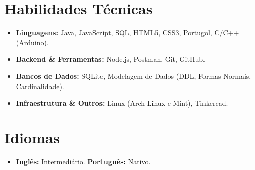\documentclass[11pt,a4paper]{article}
\begin{document}
\section*{Habilidades Técnicas}
\begin{itemize}[leftmargin=*]
    \item \textbf{Linguagens:} Java, JavaScript, SQL, HTML5, CSS3, Portugol, C/C++ (Arduino).
    \item \textbf{Backend \& Ferramentas:} Node.js, Postman, Git, GitHub.
    \item \textbf{Bancos de Dados:} SQLite, Modelagem de Dados (DDL, Formas Normais, Cardinalidade).
    \item \textbf{Infraestrutura \& Outros:} Linux (Arch Linux e Mint), Tinkercad.
\end{itemize}

\section*{Idiomas}
\begin{itemize}[leftmargin=*]
    \item \textbf{Inglês:} Intermediário. \hfill \textbf{Português:} Nativo.
\end{itemize}
\end{document}
